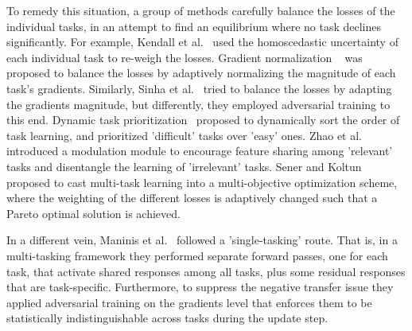 \documentclass[runningheads]{llncs}
\begin{document}
To remedy this situation, a group of methods carefully balance the losses of the individual tasks, in an attempt to find an equilibrium where no task declines significantly. For example, Kendall et al.~\cite{kendall2018multi} used the homoscedastic uncertainty of each individual task to re-weigh the losses. Gradient normalization ~\cite{chen2018gradnorm} was proposed to balance the losses by adaptively normalizing the magnitude of each task's gradients. Similarly, Sinha et al.~\cite{sinha2018gradient} tried to balance the losses by adapting the gradients magnitude, but differently, they employed adversarial training to this end. Dynamic task prioritization~\cite{guo2018dynamic} proposed to dynamically sort the order of task learning, and prioritized 'difficult' tasks over 'easy' ones. Zhao et al.~\cite{zhao2018modulation} introduced a modulation module to encourage feature sharing among 'relevant' tasks and disentangle the learning of 'irrelevant' tasks. Sener and Koltun~\cite{sener2018multi} proposed to cast multi-task learning into a multi-objective optimization scheme, where the weighting of the different losses is adaptively changed such that a Pareto optimal solution is achieved.

In a different vein, Maninis et al.~\cite{maninis2019attentive} followed a 'single-tasking' route. That is, in a multi-tasking framework they performed separate forward passes, one for each task, that activate shared responses among all tasks, plus some residual responses that are task-specific. Furthermore, to suppress the negative transfer issue they applied adversarial training on the gradients level that enforces them to be statistically indistinguishable across tasks during the update step. 
\end{document}
